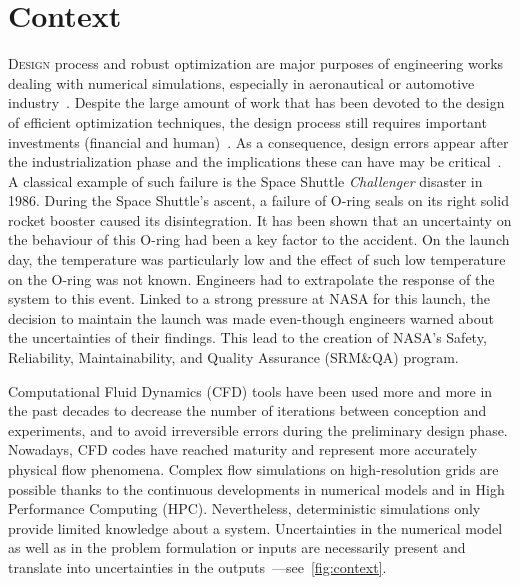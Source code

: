 \chapter{Context}

\lettrine{D}{esign} process and robust optimization are major purposes of engineering works dealing with numerical simulations, especially in aeronautical or automotive industry~\cite{duchaine2009}. Despite the large amount of work that has been devoted to the design of efficient optimization techniques, the design process still requires important investments (financial and human)~\cite{forrester2009}. As a consequence, design errors appear after the industrialization phase and the implications these can have may be critical~\cite{draper1995}. A classical example of such failure is the Space Shuttle \emph{Challenger} disaster in 1986. During the Space Shuttle's ascent, a failure of O-ring seals on its right solid rocket booster caused its disintegration. It has been shown that an uncertainty on the behaviour of this O-ring had been a key factor to the accident. On the launch day, the temperature was particularly low and the effect of such low temperature on the O-ring was not known. Engineers had to extrapolate the response of the system to this event. Linked to a strong pressure at NASA for this launch, the decision to maintain the launch was made even-though engineers warned about the uncertainties of their findings. This lead to the creation of NASA's Safety, Reliability, Maintainability, and Quality Assurance (SRM\&QA) program.

Computational Fluid Dynamics (CFD) tools have been used more and more in the past decades to decrease the number of iterations between conception and experiments, and to avoid irreversible errors during the preliminary design phase. Nowadays, CFD codes have reached maturity and represent more accurately physical flow phenomena. Complex flow simulations on high-resolution grids are possible thanks to the continuous developments in numerical models and in High Performance Computing (HPC). Nevertheless, deterministic simulations only provide limited knowledge about a system. Uncertainties in the numerical model as well as in the problem formulation or inputs are necessarily present and translate into uncertainties in the outputs~\cite{Sacks1989}---see~\cref{fig:context}.

